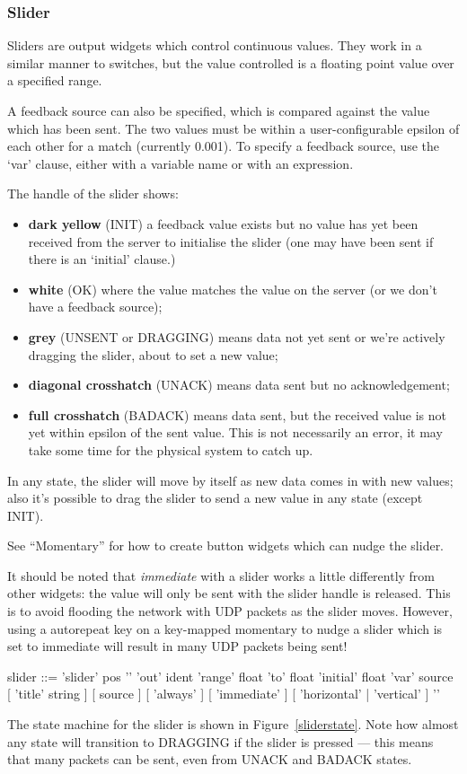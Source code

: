 \subsubsection{Slider}
Sliders are output widgets which control continuous values. They
work in a similar manner to switches, but the value controlled
is a floating point value over a specified range.

A feedback source can also be specified, which is compared against
the value which has been sent. The two values must be within
a user-configurable epsilon of each other for a match (currently 0.001).
To specify a feedback source, use the `var' clause, either with a variable name
or with an expression.

The handle of the slider shows:
\begin{itemize}
\item \textbf{dark yellow} (INIT) a feedback value exists but no value has yet been received
from the server to initialise the slider (one may have been sent if there is an `initial'
clause.)
\item \textbf{white} (OK) where the value matches the value on the server (or we
don't have a feedback source);
\item \textbf{grey} (UNSENT or DRAGGING) means data not yet sent or we're actively
dragging the slider, about to set a new value;
\item \textbf{diagonal crosshatch} (UNACK) means data sent but no acknowledgement;
\item \textbf{full crosshatch} (BADACK) means data sent, but the received value is not
yet within epsilon of the sent value. This is not necessarily an error,
it may take some time for the physical system to catch up.
\end{itemize}
In any state, the slider will move by itself as new data comes in with new values; also it's possible
to drag the slider to send a new value in any state (except INIT).

See ``Momentary'' for how to create button widgets which can nudge the slider.

It should be noted that \emph{immediate} with a slider works a little
differently from other widgets: the value will only be sent with the slider
handle is released. This is to avoid flooding the network with UDP packets as
the slider moves. However, using a autorepeat key on a key-mapped momentary
to nudge a slider which is set to immediate will result in many UDP packets
being sent!

\begin{v}
slider      ::= 'slider' pos '{'
                    'out' ident
                    'range' float 'to' float
                    'initial' float
                    'var' source
                    [ 'title' string ]
                    [ source ]
                    [ 'always' ]
                    [ 'immediate' ]
                    [ 'horizontal' | 'vertical' ]
                '}'
\end{v}
The state machine for the slider is shown in Figure~\ref{sliderstate}. Note how
almost any state will transition to DRAGGING if the slider is pressed --- this means
that many packets can be sent, even from UNACK and BADACK states.

